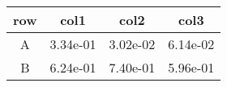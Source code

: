 \begin{tabular}{cccc}
\toprule
row&col1&col2&col3\tabularnewline
\midrule
A&3.34e-01&3.02e-02&6.14e-02\tabularnewline
B&6.24e-01&7.40e-01&5.96e-01\tabularnewline
\bottomrule
\end{tabular}
